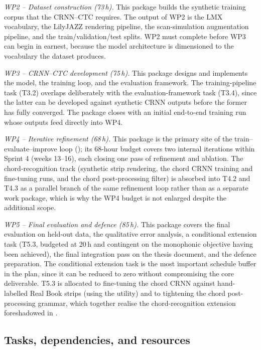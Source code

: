 \textit{WP2 -- Dataset construction (73\,h).}
This package builds the synthetic training corpus that the
CRNN--CTC requires.
The output of WP2 is the LMX vocabulary, the LilyJAZZ rendering
pipeline, the scan-simulation augmentation pipeline, and the
train/validation/test splits.
WP2 must complete before WP3 can begin in earnest, because the
model architecture is dimensioned to the vocabulary the dataset
produces.

\textit{WP3 -- CRNN--CTC development (75\,h).}
This package designs and implements the model, the training loop,
and the evaluation framework.
The training-pipeline task (T3.2) overlaps deliberately with the
evaluation-framework task (T3.4), since the latter can be
developed against synthetic CRNN outputs before the former has
fully converged.
The package closes with an initial end-to-end training run whose
outputs feed directly into WP4.

\textit{WP4 -- Iterative refinement (68\,h).}
This package is the primary site of the train--evaluate--improve
loop (); its 68-hour budget
covers two internal iterations within Sprint 4 (weeks 13--16),
each closing one pass of refinement and ablation.
The chord-recognition track (synthetic strip rendering, the chord
CRNN training and fine-tuning runs, and the chord post-processing
filter) is absorbed into T4.2 and T4.3 as a parallel branch of
the same refinement loop rather than as a separate work package,
which is why the WP4 budget is not enlarged despite the additional
scope.

\textit{WP5 -- Final evaluation and defence (85\,h).}
This package covers the final evaluation on held-out data, the
qualitative error analysis, a conditional extension task (T5.3,
budgeted at 20\,h and contingent on the monophonic objective
having been achieved), the final integration pass on the thesis
document, and the defence preparation.
The conditional extension task is the most important schedule
buffer in the plan, since it can be reduced to zero without
compromising the core deliverable.
T5.3 is allocated to fine-tuning the chord CRNN against
hand-labelled Real Book strips (using the
 utility) and to tightening the
chord post-processing grammar, which together realise the
chord-recognition extension foreshadowed in
.

\subsection{Tasks, dependencies, and resources}


